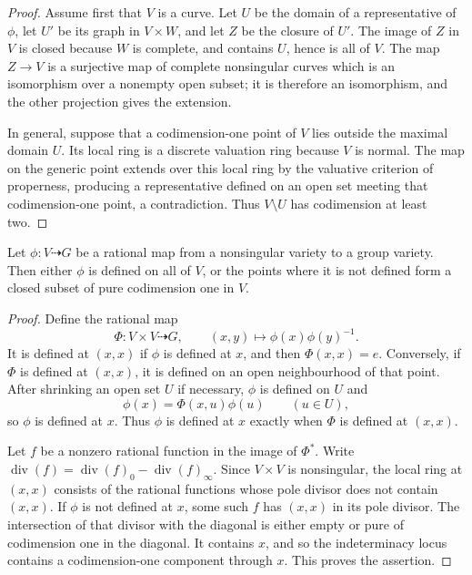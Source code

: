\begin{proof}
Assume first that $V$ is a curve.  Let $U$ be the domain of a representative
of $\phi$, let $U'$ be its graph in $V\times W$, and let $Z$ be the closure of
$U'$.  The image of $Z$ in $V$ is closed because $W$ is complete, and contains
$U$, hence is all of $V$.  The map $Z\to V$ is a surjective map of complete
nonsingular curves which is an isomorphism over a nonempty open subset; it is
therefore an isomorphism, and the other projection gives the extension.

In general, suppose that a codimension-one point of $V$ lies outside the
maximal domain $U$.  Its local ring is a discrete valuation ring because $V$
is normal.  The map on the generic point extends over this local ring by the
valuative criterion of properness, producing a representative defined on an
open set meeting that codimension-one point, a contradiction.  Thus
$V\setminus U$ has codimension at least two.
\end{proof}

\begin{lemma}
\label{lem:milne-group-rational-indeterminacy}

Let $\phi:V\dashrightarrow G$ be a rational map from a nonsingular variety to
a group variety.  Then either $\phi$ is defined on all of $V$, or the points
where it is not defined form a closed subset of pure codimension one in $V$.
\end{lemma}

\begin{proof}
Define the rational map
\[
 \Phi:V\times V\dashrightarrow G,\qquad
 (x,y)\longmapsto\phi(x)\phi(y)^{-1}.
\]
It is defined at $(x,x)$ if $\phi$ is defined at $x$, and then
$\Phi(x,x)=e$.  Conversely, if $\Phi$ is defined at $(x,x)$, it is defined on
an open neighbourhood of that point.  After shrinking an open set $U$ if
necessary, $\phi$ is defined on $U$ and
\[
 \phi(x)=\Phi(x,u)\phi(u)\qquad(u\in U),
\]
so $\phi$ is defined at $x$.  Thus $\phi$ is defined at $x$ exactly when
$\Phi$ is defined at $(x,x)$.

Let $f$ be a nonzero rational function in the image of $\Phi^*$.  Write
$\operatorname{div}(f)=\operatorname{div}(f)_0-\operatorname{div}(f)_\infty$.
Since $V\times V$ is nonsingular, the local ring at $(x,x)$ consists of the
rational functions whose pole divisor does not contain $(x,x)$.  If $\phi$ is
not defined at $x$, some such $f$ has $(x,x)$ in its pole divisor.  The
intersection of that divisor with the diagonal is either empty or pure of
codimension one in the diagonal.  It contains $x$, and so the indeterminacy
locus contains a codimension-one component through $x$.  This proves the
assertion.
\end{proof}

